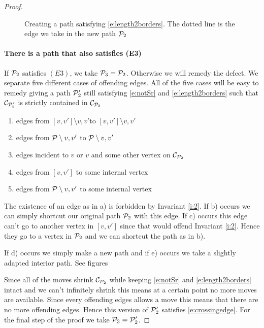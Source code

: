 \begin{proof}
\begin{figure}
    \caption{Creating a path satisfying \ref{e:length2borders}. The dotted line is the edge we take in the new path $\P_2$}\label{fig:E2}
\end{figure}

\newcommand{\intvv}{\ensuremath{[v,v']\setminus{v,v'}}}
\newcommand{\intP}{\ensuremath{\P\setminus{v,v'}}}

\paragraph{There is a path that also satisfies (E3)}
If $\P_2$ satisfies $(E3)$, we take $\P_3 = \P_2$. Otherwise we will remedy the defect. We separate five different cases of offending edges. All of the five cases will be easy to remedy giving a path $\P'_2$ still satisfying \ref{e:notSr} and \ref{e:length2borders} such that $\C_{\P'_2}$ is strictly contained in $\C_{\P_2}$ %
\begin{enumerate}
 \renewcommand*{\labelenumi}{\alph{enumi})}%
 \renewcommand*{\theenumi}{\alph{enumi})}%
 \item edges from \intvv to $\intvv$
 \item edges from $\intP$ to $\intP$
 \item edges incident to $v$ or $v$ and some other vertex on $\C_{\P_2}$
 \item edges from $[v,v']$ to some internal vertex 
 \item edges from $\intP$ to some internal vertex
\end{enumerate}

The existence of an edge as in a) is forbidden by Invariant \ref{i:2}. If b) occurs we can simply shortcut our original path $\P_2$ with this edge. If c) occurs this edge can't go to another vertex in $[v,v']$ since that would offend Invariant \ref{i:2}. Hence they go to a vertex in $\P_2$ and we can shortcut the path as in b).

If d) occurs we simply make a new path and if e) occurs we take a slightly adapted interior path. See figures


Since all of the moves shrink $\C_{\P_2}$ while keeping \ref{e:notSr} and \ref{e:length2borders} intact and we can't infinitely shrink this means at a certain point no more moves are available. Since every offending edges allows a move this means that there are no more offending edges. Hence this version of $\P'_2$ satisfies \ref{e:crossingedge}. For the final step of the proof we take $\P_3 = \P'_2$.


\end{proof}
